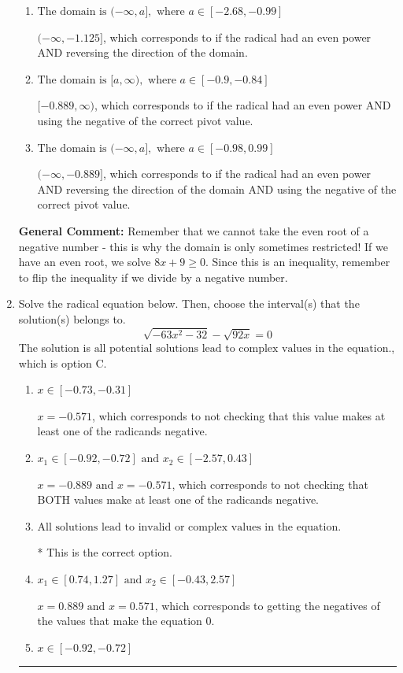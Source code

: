 \documentclass{extbook}[14pt]
\newcommand{\litem}[1]{\item #1

\rule{\textwidth}{0.4pt}}
\begin{document}
\begin{enumerate}
{\begin{enumerate}[label=\Alph*.]
$[-1.125, \infty)$, which corresponds to if the radical had an even power.
\item \( \text{The domain is } (-\infty, a], \text{   where } a \in [-2.68, -0.99] \)

$(-\infty, -1.125]$, which corresponds to if the radical had an even power AND reversing the direction of the domain.
\item \( \text{The domain is } [a, \infty), \text{   where } a \in [-0.9, -0.84] \)

$[-0.889, \infty)$, which corresponds to if the radical had an even power AND using the negative of the correct pivot value.
\item \( \text{The domain is } (-\infty, a], \text{   where } a \in [-0.98, 0.99] \)

$(-\infty, -0.889]$, which corresponds to if the radical had an even power AND reversing the direction of the domain AND using the negative of the correct pivot value.
\end{enumerate}

\textbf{General Comment:} Remember that we cannot take the even root of a negative number - this is why the domain is only sometimes restricted! If we have an even root, we solve $8 x + 9 \geq 0$. Since this is an inequality, remember to flip the inequality if we divide by a negative number.
}
\litem{
Solve the radical equation below. Then, choose the interval(s) that the solution(s) belongs to.
\[ \sqrt{-63 x^2 - 32} - \sqrt{92 x} = 0 \]The solution is \( \text{all potential solutions lead to complex values in the equation.} \), which is option C.\begin{enumerate}[label=\Alph*.]
\item \( x \in [-0.73,-0.31] \)

$x = -0.571$, which corresponds to not checking that this value makes at least one of the radicands negative.
\item \( x_1 \in [-0.92, -0.72] \text{ and } x_2 \in [-2.57,0.43] \)

$x = -0.889 \text{ and } x = -0.571$, which corresponds to not checking that BOTH values make at least one of the radicands negative.
\item \( \text{All solutions lead to invalid or complex values in the equation.} \)

* This is the correct option.
\item \( x_1 \in [0.74, 1.27] \text{ and } x_2 \in [-0.43,2.57] \)

$x = 0.889 \text{ and } x = 0.571$, which corresponds to getting the negatives of the values that make the equation 0.
\item \( x \in [-0.92,-0.72] \)


\end{enumerate}}
\end{enumerate}
\end{document}
